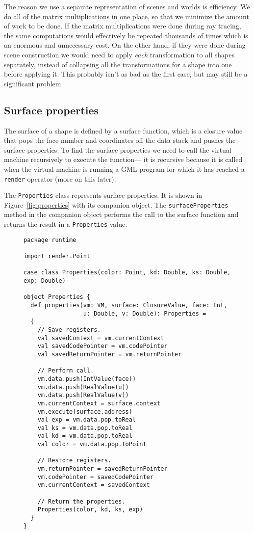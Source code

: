 The reason we use a separate representation of scenes and worlds is efficiency.
We do all of the matrix multiplications in one place,
so that we minimize the amount of work to be done.
If the matrix multiplications were done during ray tracing,
the same computations would effectively be repeated thousands of times
which is an enormous and unnecessary cost.
On the other hand,
if they were done during scene construction
we would need to apply \emph{each} transformation to all shapes separately,
instead of collapsing all the transformations for a shape into one
before applying it.
This probably isn't as bad as the first case,
but may still be a significant problem.


\subsection{Surface properties\label{sec:properties}}

The surface of a shape is defined by a surface function,
which is a closure value
that pops the face number and coordinates off the data stack
and pushes the surface properties.
To find the surface properties we need to
call the virtual machine recursively to execute the function---%
it is recursive because it is called when
the virtual machine is running
a GML program for which it has reached a \verb!render! operator
(more on this later).

The \verb!Properties! class represents surface properties.
It is shown in Figure~\ref{fig:properties} with its companion object.
The \verb!surfaceProperties! method in the companion object 
performs the call to the surface function
and returns the result in a \verb!Properties! value.

\begin{figure}
\begin{verbatim}
package runtime

import render.Point

case class Properties(color: Point, kd: Double, ks: Double, exp: Double)

object Properties {
  def properties(vm: VM, surface: ClosureValue, face: Int,
                 u: Double, v: Double): Properties =
  {
    // Save registers.
    val savedContext = vm.currentContext
    val savedCodePointer = vm.codePointer
    val savedReturnPointer = vm.returnPointer

    // Perform call.
    vm.data.push(IntValue(face))
    vm.data.push(RealValue(u))
    vm.data.push(RealValue(v))
    vm.currentContext = surface.context
    vm.execute(surface.address)
    val exp = vm.data.pop.toReal
    val ks = vm.data.pop.toReal
    val kd = vm.data.pop.toReal
    val color = vm.data.pop.toPoint

    // Restore registers.
    vm.returnPointer = savedReturnPointer
    vm.codePointer = savedCodePointer
    vm.currentContext = savedContext

    // Return the properties.
    Properties(color, kd, ks, exp)
  }
}
\end{verbatim}
\getcaption
\end{figure}

